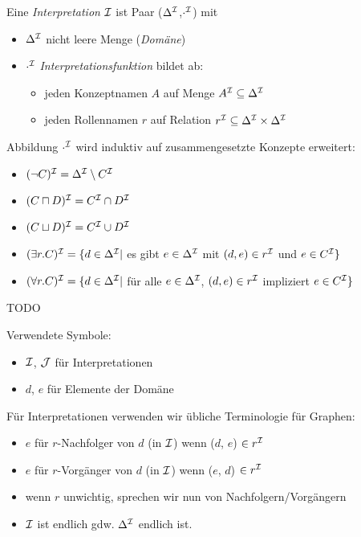 \begin{definition}
Eine \emph{Interpretation} $\mathcal{I}$ ist Paar ($\Delta^{\mathcal{I}}$,$\cdot^{\mathcal{I}}$) mit
  \begin{itemize}
    \item{$\Delta^{\mathcal{I}}$ nicht leere Menge (\emph{Domäne})}
    \item{$\cdot^{\mathcal{I}}$ \emph{Interpretationsfunktion} bildet ab:
     \begin{itemize}
       \item{jeden Konzeptnamen $A$ auf Menge $A^{\mathcal{I}} \subseteq \Delta^{\mathcal{I}}$}
       \item{jeden Rollennamen $r$ auf Relation $r^{\mathcal{I}} \subseteq \Delta^{\mathcal{I}} \times \Delta^{\mathcal{I}}$}
     \end{itemize}}
  \end{itemize}

Abbildung $\cdot^{\mathcal{I}}$ wird induktiv auf zusammengesetzte Konzepte erweitert:
\begin{itemize}
  \item $(\neg C)^{\mathcal{I}} = \Delta^{\mathcal{I}} \setminus C^{\mathcal{I}}$
  \item $(C \sqcap D)^{\mathcal{I}} = C^{\mathcal{I}} \cap D^{\mathcal{I}}$
  \item $(C \sqcup D)^{\mathcal{I}} = C^{\mathcal{I}} \cup D^{\mathcal{I}}$
  \item $(\exists r.C)^{\mathcal{I}} = \{d \in \Delta^{\mathcal{I}} |$ es gibt $ e \in \Delta^{\mathcal{I}}$ mit $(d,e) \in r^{\mathcal{I}}$ und $e \in C^{\mathcal{I}}\}$
  \item $(\forall r.C)^{\mathcal{I}} = \{d \in \Delta^{\mathcal{I}} |$ für alle $ e \in \Delta^{\mathcal{I}}$, $(d,e) \in r^{\mathcal{I}}$ impliziert $e \in C^{\mathcal{I}}\}$
\end{itemize}
\end{definition}

\begin{tafel}
    TODO
\end{tafel}

Verwendete Symbole:

\begin{itemize}
  \item $\mathcal{I}$, $\mathcal{J}$ für Interpretationen
  \item $d$, $e$ für Elemente der Domäne
\end{itemize}

Für Interpretationen verwenden wir übliche Terminologie für Graphen:

\begin{itemize}
  \item $e$ für $r$-Nachfolger von $d$ (in $\mathcal{I}$) wenn ($d$, $e$) $\in r^{\mathcal{I}}$
  \item $e$ für $r$-Vorgänger von $d$ (in $\mathcal{I}$) wenn ($e$, $d$) $\in r^{\mathcal{I}}$
  \item wenn $r$ unwichtig, sprechen wir nun von Nachfolgern/Vorgängern
  \item $\mathcal{I}$ ist endlich gdw. $\Delta^{\mathcal{I}}$ endlich ist.
\end{itemize}

